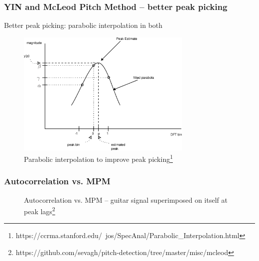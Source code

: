 \documentclass{beamer}
\begin{document}

\begin{frame}
	\frametitle{YIN and McLeod Pitch Method -- better peak picking}
	Better peak picking: parabolic interpolation in both
	\begin{figure}
		\includegraphics[height=6cm]{./parabolicinterp.png}
		\caption{Parabolic interpolation to improve peak picking\footnote{https://ccrma.stanford.edu/~jos/SpecAnal/Parabolic\_Interpolation.html}}
	\end{figure}
\end{frame}

\begin{frame}
	\frametitle{Autocorrelation vs. MPM}
	\begin{figure}
		\hspace{0.1em}
		\caption{Autocorrelation vs. MPM -- guitar signal superimposed on itself at peak lags\footnote{https://github.com/sevagh/pitch-detection/tree/master/misc/mcleod}}
	\end{figure}
\end{frame}
\end{document}
